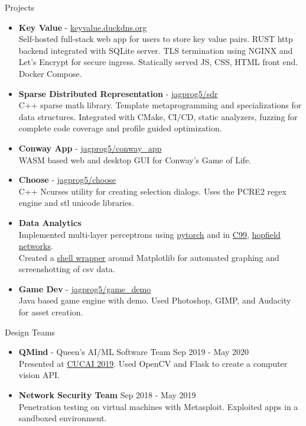 \documentclass{resume} %
\begin{document}
\begin{rSection}{Projects}
    \begin{itemize}
        \item {\bf Key Value} - \href{https://keyvalue.duckdns.org/}{keyvalue.duckdns.org}\\
        Self-hosted full-stack web app for users to store key value pairs. RUST http backend integrated with SQLite server. TLS termination using NGINX and Let's Encrypt for secure ingress.
        Statically served JS, CSS, HTML front end. Docker Compose. 
        \item {\bf Sparse Distributed Representation} - \href{https://github.com/jagprog5/SDR/}{jagprog5/sdr}\\
        C++ sparse math library. Template metaprogramming and specializations for data structures. Integrated with CMake, CI/CD, static analyzers, fuzzing for complete code coverage and profile guided optimization.
        \item {\bf Conway App} - \href{https://github.com/jagprog5/conway_app/}{jagprog5/conway\_app}\\
        WASM based web and desktop GUI for Conway's Game of Life.
        \item {\bf Choose} - \href{https://github.com/jagprog5/choose/}{jagprog5/choose}\\
        C++ Ncurses utility for creating selection dialogs.
        Uses the PCRE2 regex engine and stl unicode libraries.
        \item {\bf Data Analytics}\\
        Implemented multi-layer perceptrons using \href{https://github.com/jagprog5/mlp}{pytorch} and in \href{https://github.com/jagprog5/CNeuralNet}{C99}, \href{https://github.com/jagprog5/hopfield}{hopfield networks}.\\
        Created a \href{https://github.com/jagprog5/CSV-Plotter}{shell wrapper} around Matplotlib for automated graphing and screenshotting of csv data. 
        \item {\bf Game Dev} - \href{https://github.com/jagprog5/GameDemo}{jagprog5/game\_demo}\\
        Java based game engine with demo. Used Photoshop, GIMP, and Audacity for asset creation.
    \end{itemize}
\end{rSection}

\begin{rSection}{Design Teams}
    \begin{itemize}
        \item {\bf QMind} - Queen's AI/ML Software Team \hfill {Sep 2019 - May 2020}\\
        Presented at \href{https://medium.com/qmind-ai/cucai2019-c9d5f848f5c}{CUCAI 2019}. Used OpenCV and Flask to create a computer vision API.
        \item {\bf Network Security Team} \hfill {Sep 2018 - May 2019}\\
        Penetration testing on virtual machines with Metasploit. Exploited apps in a sandboxed environment.
\end{itemize}
\end{rSection}
\end{document}
